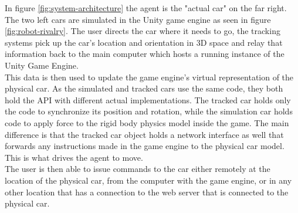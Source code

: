 \documentclass[10pt,a4paper]{article}
\begin{document}
	In figure \ref{fig:system-architecture} the agent is the "actual car" on the far right. The two left cars are simulated in the Unity game engine as seen in figure \ref{fig:robot-rivalry}. The user directs the car where it needs to go, the tracking systems pick up the car's location and orientation in 3D space and relay that information back to the main computer which hosts a running instance of the Unity Game Engine.
	\\
	This data is then used to update the game engine's virtual representation of the physical car. As the simulated and tracked cars use the same code, they both hold the API with different actual implementations. The tracked car holds only the code to synchronize its position and rotation, while the simulation car holds code to apply force to the rigid body physics model inside the game. The main difference is that the tracked car object holds a network interface as well that forwards any instructions made in the game engine to the physical car model. This is what drives the agent to move.
	\\
	The user is then able to issue commands to the car either remotely at the location of the physical car, from the computer with the game engine, or in any other location that has a connection to the web server that is connected to the physical car.
\end{document}

